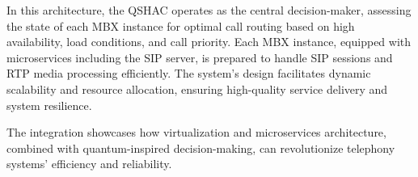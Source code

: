 \documentclass[12pt]{article}
\begin{document}
In this architecture, the QSHAC operates as the central decision-maker, assessing the state of each MBX instance for optimal call routing based on high availability, load conditions, and call priority. Each MBX instance, equipped with microservices including the SIP server, is prepared to handle SIP sessions and RTP media processing efficiently. The system's design facilitates dynamic scalability and resource allocation, ensuring high-quality service delivery and system resilience.

The integration showcases how virtualization and microservices architecture, combined with quantum-inspired decision-making, can revolutionize telephony systems' efficiency and reliability.
\end{document}

